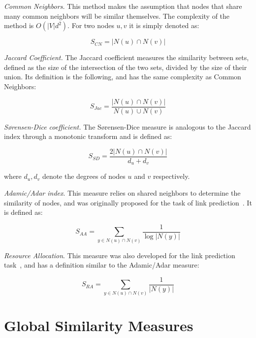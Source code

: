 \emph{Common Neighbors.} This method makes the assumption that nodes that
share many common neighbors will be similar themselves. The complexity of
the method is $O(|V|d^2)$. For two nodes $u, v$
it is simply denoted as:

\begin{equation}
	S_{CN} = |N(u) \cap N(v)|
\end{equation}


\emph{Jaccard Coefficient.} The Jaccard coefficient measures the similarity between
sets, defined as the size of the intersection of the two sets, divided by the size of their
union. Its definition is the following, and has the same complexity as Common Neighbors:

\begin{equation}
	S_{Jac} = \frac{|N(u) \cap N(v)|}{N(u) \cup N(v)}
\end{equation}

\emph{S{\o}rensen-Dice coefficient.} The S{\o}rensen-Dice measure \cite{Dice45,Sorensen48} is
analogous to the Jaccard index through a monotonic transform and is defined as:

\begin{equation}
	S_{SD} = \frac{2|N(u) \cap N(v)|}{d_u + d_v}
\end{equation}

\noindent
where $d_u, d_v$ denote the degrees of nodes $u$ and $v$ respectively.

\emph{Adamic/Adar index}. This measure relies on shared neighbors to determine
the similarity of nodes, and was originally proposed for the task of link
prediction~\cite{adamic-adar}. It is defined as:

\begin{equation}
	S_{AA} = \sum_{y \in N(u) \cap N(v)}{\frac{1}{\log{|N(y)|}}}
\end{equation}

\emph{Resource Allocation}. This measure was also developed for the
link prediction task~\cite{resource-allocation-sim}, and has a definition
similar to the Adamic/Adar measure:

\begin{equation}
S_{RA} = \sum_{y \in N(u) \cap N(v)}{\frac{1}{|N(y)|}}
\end{equation}

\section{Global Similarity Measures}


